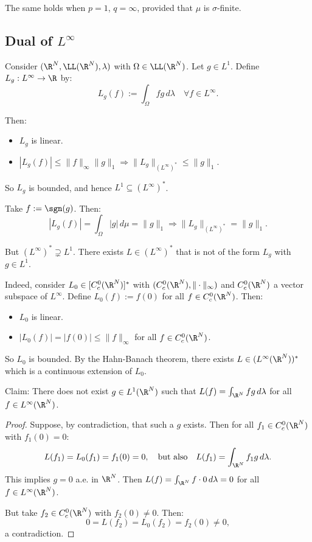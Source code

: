 \begin{remark}
The same holds when $p = 1$, $q = \infty$, provided that $\mu$ is $\sigma$-finite.
\end{remark}

\subsection{Dual of $L^\infty$}

Consider $(\R^N, \LL(\R^N), \lambda)$ with $\Omega \in \LL(\R^N)$. Let $g \in L^1$. Define $L_g : L^\infty \to \R$ by:
\[
L_g(f) := \int_\Omega fg \, d\lambda \quad \forall f \in L^\infty.
\]

\clearpage
Then:
\begin{itemize}
\item $L_g$ is linear.
\item $|L_g(f)| \leq \|f\|_\infty \|g\|_1 \Rightarrow \|L_g\|_{(L^\infty)^*} \leq \|g\|_1$.
\end{itemize}
So $L_g$ is bounded, and hence $L^1 \subseteq (L^\infty)^*$.

Take $f := \sgn(g)$. Then:
\[
|L_g(f)| = \int_\Omega |g| \, d\mu = \|g\|_1 \Rightarrow \|L_g\|_{(L^\infty)^*} = \|g\|_1.
\]

But $(L^\infty)^* \supsetneq L^1$. There exists $L \in (L^\infty)^*$ that is not of the form $L_g$ with $g \in L^1$.

Indeed, consider $L_0 \in [C_c^0(\R^N)]^*$ with $(C_c^0(\R^N), \|\cdot\|_\infty)$ and $C_c^0(\R^N)$ a vector subspace of $L^\infty$. Define $L_0(f) := f(0)$ for all $f \in C_c^0(\R^N)$. Then:
\begin{itemize}
\item $L_0$ is linear.
\item $|L_0(f)| = |f(0)| \leq \|f\|_\infty$ for all $f \in C_c^0(\R^N)$.
\end{itemize}
So $L_0$ is bounded. By the Hahn-Banach theorem, there exists $L \in (L^\infty(\R^N))^*$ which is a continuous extension of $L_0$.

\vspace{15pt}

\begin{remark}
Claim: There does not exist $g \in L^1(\R^N)$ such that $L(f) = \int_{\R^N} fg \, d\lambda$ for all $f \in L^\infty(\R^N)$.

\begin{proof}
Suppose, by contradiction, that such a $g$ exists. Then for all $f_1 \in C_c^0(\R^N)$ with $f_1(0) = 0$:
\[
L(f_1) = L_0(f_1) = f_1(0) = 0, \quad \text{but also} \quad L(f_1) = \int_{\R^N} f_1 g \, d\lambda.
\]
This implies $g = 0$ a.e. in $\R^N$. Then $L(f) = \int_{\R^N} f \cdot 0 \, d\lambda = 0$ for all $f \in L^\infty(\R^N)$.

But take $f_2 \in C_c^0(\R^N)$ with $f_2(0) \neq 0$. Then:
\[
0 = L(f_2) = L_0(f_2) = f_2(0) \neq 0,
\]
a contradiction.
\end{proof}
\end{remark}

